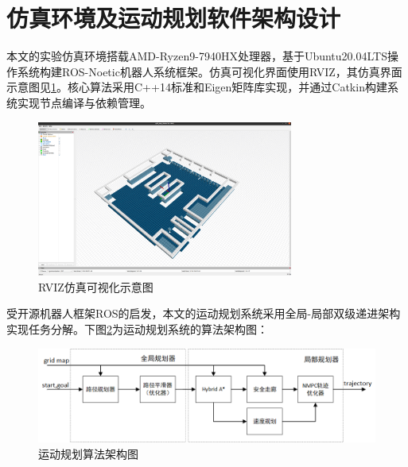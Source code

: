 \documentclass[master,academic]{ysuthesis} %
\begin{document}
	\section{仿真环境及运动规划软件架构设计}
	本文的实验仿真环境搭载AMD-Ryzen9-7940HX处理器，基于Ubuntu20.04LTS操作系统构建ROS-Noetic机器人系统框架。仿真可视化界面使用RVIZ，其仿真界面示意图见\ref{fig:rviz仿真界面}。核心算法采用C++14标准和Eigen矩阵库实现，并通过Catkin构建系统实现节点编译与依赖管理。
	\begin{figure}[!ht]
		\centering
		\includegraphics[width=0.75\textwidth]{rviz_view.png}
		\caption{RVIZ仿真可视化示意图}
		\label{fig:rviz仿真界面}
	\end{figure}

	受开源机器人框架ROS的启发，本文的运动规划系统采用全局-局部双级递进架构实现任务分解。下图\ref{fig:运动规划算法框架}为运动规划系统的算法架构图：
		\begin{figure}[!ht]
			\centering
			\includegraphics[width=1.0\textwidth]{运动规划算法框架.png}
			\caption{运动规划算法架构图}
			\label{fig:运动规划算法框架}
		\end{figure}
\end{document}
